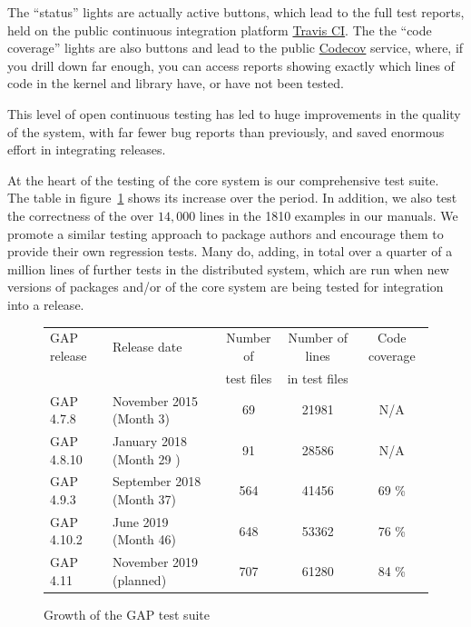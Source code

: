 The ``status'' lights are actually active buttons, which lead to the
full test reports, held on the public continuous integration platform
\href{https://travis-ci.org/}{Travis CI}. The the ``code coverage''
lights are also buttons and lead to the public
\href{https://codecov.io/}{Codecov} service, where, if you drill down far
enough, you can access reports showing exactly which lines of code in the kernel
and library have, or have not been tested.

This level of open continuous testing has led to huge improvements in
the quality of the system, with far fewer bug reports than previously,
and saved enormous effort in integrating releases.

At the heart of the testing of the core \GAP system is our
comprehensive test suite. The table in
figure~\ref{fig:test-suite-growth} shows its increase over the period.
In addition, we also test the correctness of the
over $14,000$ lines in the 1810 examples in our manuals. We promote a similar testing approach to \GAP package authors and
encourage them to provide their own regression
tests. Many do, adding, in total over a quarter of a million lines of
further tests in the distributed system, which are run when new
versions of packages and/or of the core system are being tested for
integration into a release.


\begin{figure}[!ht]
\begin{center}
\begin{tabular}{| l | l | c | c | c |} 
\hline GAP release & Release date & Number of & Number of lines & Code
coverage \\ & & test files & in test files & \\ \hline GAP 4.7.8 &
November 2015 (Month 3) & 69 & 21981 & N/A \\ \hline GAP 4.8.10 &
January 2018 (Month 29 ) & 91 & 28586 & N/A \\ \hline GAP 4.9.3 &
September 2018 (Month 37) & 564 & 41456 & 69 \% \\ \hline GAP 4.10.2 &
June 2019 (Month 46) & 648 & 53362 & 76 \% \\ \hline GAP 4.11 &
November 2019 (planned) & 707 & 61280 & 84 \% \\ \hline
\end{tabular}
\caption{Growth of the GAP test suite}\label{fig:test-suite-growth}
\end{center}
\end{figure}

